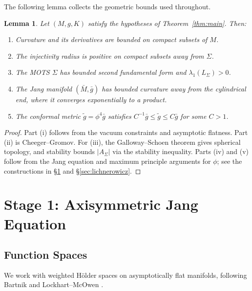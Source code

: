 \documentclass[12pt]{article}
\theoremstyle{plain}
\newtheorem{lemma}[theorem]{Lemma}
\theoremstyle{definition}
\theoremstyle{remark}
\newcommand{\tg}{\tilde{g}}
\newcommand{\bg}{\bar{g}}
\newcommand{\bM}{\bar{M}}
\begin{document}
The following lemma collects the geometric bounds used throughout.

\begin{lemma}\label{lem:bounded-geometry}
Let $(M, g, K)$ satisfy the hypotheses of Theorem~\ref{thm:main}. Then:
\begin{enumerate}[label=\textup{(\roman*)}]
    \item Curvature and its derivatives are bounded on compact subsets of $M$.
    \item The injectivity radius is positive on compact subsets away from $\Sigma$.
    \item The MOTS $\Sigma$ has bounded second fundamental form and $\lambda_1(L_\Sigma) > 0$.
    \item The Jang manifold $(\bM, \bg)$ has bounded curvature away from the cylindrical end, where it converges exponentially to a product.
    \item The conformal metric $\tg = \phi^4 \bg$ satisfies $C^{-1} \bg \leq \tg \leq C \bg$ for some $C > 1$.
\end{enumerate}
\end{lemma}

\begin{proof}
Part (i) follows from the vacuum constraints and asymptotic flatness. Part (ii) is Cheeger--Gromov. For (iii), the Galloway--Schoen theorem \cite{gallowayschoen2006} gives spherical topology, and stability bounds $|A_\Sigma|$ via the stability inequality. Parts (iv) and (v) follow from the Jang equation and maximum principle arguments for $\phi$; see the constructions in \S\ref{sec:jang} and \S\ref{sec:lichnerowicz}.
\end{proof}


\section{Stage 1: Axisymmetric Jang Equation}\label{sec:jang}

\subsection{Function Spaces}

We work with weighted H\"older spaces on asymptotically flat manifolds, following Bartnik \cite{bartnik1986} and Lockhart--McOwen \cite{lockhartmccowen1985}.
\end{document}
